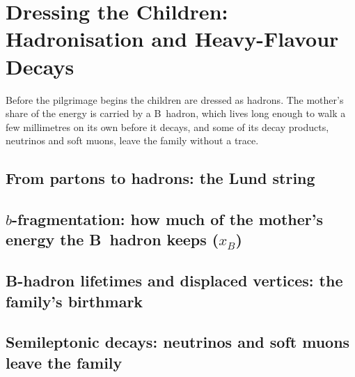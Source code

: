 \chapter{Dressing the Children: Hadronisation and Heavy-Flavour Decays}
\label{ch:dressing_children}

\begin{journeybox}
Before the pilgrimage begins the children are dressed as hadrons. The mother's
share of the energy is carried by a B~hadron, which lives long enough to walk a
few millimetres on its own before it decays, and some of its decay products,
neutrinos and soft muons, leave the family without a trace.
\end{journeybox}


\section{From partons to hadrons: the Lund string}
\label{sec:dressing_children:from_partons_to_hadrons_the_lund_string}

\section{$b$-fragmentation: how much of the mother's energy the B~hadron keeps ($x_B$)}
\label{sec:dressing_children:b_fragmentation_how_much_of_the_mother_s}

\section{B-hadron lifetimes and displaced vertices: the family's birthmark}
\label{sec:dressing_children:b_hadron_lifetimes_and_displaced_vertice}

\section{Semileptonic decays: neutrinos and soft muons leave the family}
\label{sec:dressing_children:semileptonic_decays_neutrinos_and_soft_m}

